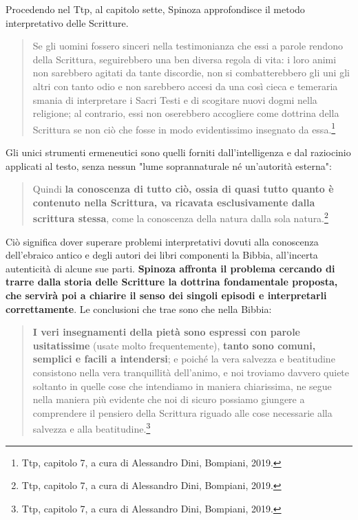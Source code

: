 Procedendo nel Ttp, al capitolo sette, Spinoza approfondisce il metodo interpretativo delle Scritture. 

\begin{quotation}
	\small Se gli uomini fossero sinceri nella testimonianza che essi a parole rendono della
	Scrittura, seguirebbero una ben diversa regola di vita: i loro animi non sarebbero
	agitati da tante discordie, non si combatterebbero gli uni gli altri con tanto odio
	e non sarebbero accesi da una così cieca e temeraria smania di interpretare i Sacri
	Testi e di scogitare nuovi dogmi nella religione; al contrario, essi non oserebbero
	accogliere come dottrina della Scrittura se non ciò che fosse in modo evidentissimo
	insegnato da essa.\footnote{Ttp, capitolo 7, a cura di Alessandro Dini, Bompiani, 2019.}
\end{quotation}

Gli unici strumenti ermeneutici sono quelli forniti dall'intelligenza e dal raziocinio applicati al testo, senza nessun "lume soprannaturale né un’autorità esterna":

\begin{quotation}
	\small Quindi \textbf{la conoscenza di
	tutto ciò, ossia di quasi tutto quanto è contenuto nella Scrittura, va ricavata
	esclusivamente dalla scrittura stessa}, come la conoscenza della natura dalla sola
	natura.\footnote{Ttp, capitolo 7, a cura di Alessandro Dini, Bompiani, 2019.}
\end{quotation}

Ciò significa dover superare problemi interpretativi dovuti alla conoscenza dell'ebraico antico e degli autori dei libri componenti la Bibbia, all'incerta autenticità di alcune sue parti. \textbf{Spinoza affronta il problema cercando di trarre dalla storia delle Scritture la dottrina fondamentale proposta, che servirà poi a chiarire il senso dei singoli episodi e interpretarli correttamente}. Le conclusioni che trae sono che nella Bibbia:

\begin{quotation}
	\small \textbf{I veri insegnamenti della pietà sono espressi con parole usitatissime} (usate molto frequentemente), \textbf{tanto sono comuni, semplici e facili a intendersi}; e poiché la vera salvezza e beatitudine consistono nella vera tranquillità dell'animo, e noi troviamo davvero quiete soltanto in quelle cose che intendiamo in maniera chiarissima, ne segue nella maniera più evidente che noi di sicuro possiamo giungere a comprendere il pensiero della Scrittura riguado alle cose necessarie alla salvezza e alla beatitudine.\footnote{Ttp, capitolo 7, a cura di Alessandro Dini, Bompiani, 2019.}
\end{quotation}


